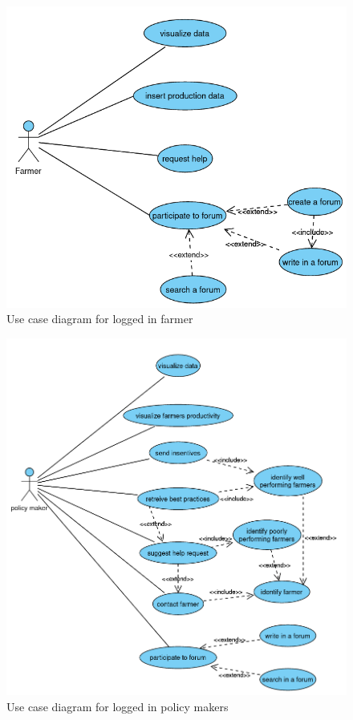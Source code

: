 \begin{figure}
	\centering
	\includegraphics[width=\textwidth]{Images/use-case-farmer.png}
	\caption{\label{fig:usecasefarmer}Use case diagram for logged in farmer}
\end{figure}

\begin{figure}
	\centering
	\includegraphics[width=\textwidth]{Images/use-case-policy.png}
	\caption{\label{fig:usecasepolicymakers}Use case diagram for logged in policy makers}
\end{figure}



